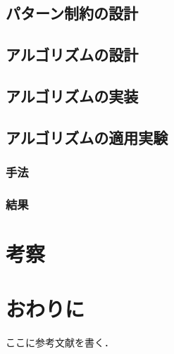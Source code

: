 \documentclass[a4paper,xelatex,ja=standard,fontsize=11pt]{bxjsreport}
\begin{document}
\section{パターン制約の設計}

\section{アルゴリズムの設計}

\section{アルゴリズムの実装}

\section{アルゴリズムの適用実験}

\subsection{手法}

\subsection{結果}

%
\chapter{考察}

%
\chapter{おわりに}

\backmatter

\begin{thebibliography}{}
	 ここに参考文献を書く．
\end{thebibliography}
\clearpage
\end{document}
